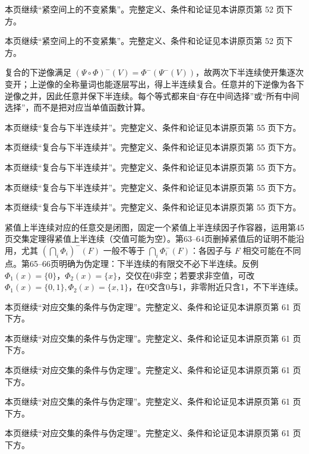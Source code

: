 本页继续“紧空间上的不变紧集”。完整定义、条件和论证见本讲原页第 52 页下方。

本页继续“紧空间上的不变紧集”。完整定义、条件和论证见本讲原页第 52 页下方。

复合的下逆像满足 $(\Psi\circ\Phi)^-(V)=\Phi^-(\Psi^-(V))$，故两次下半连续使开集逐次变开；上逆像的全称量词也能逐层写出，得上半连续复合。任意并的下逆像为各下逆像之并，因此任意并保下半连续。每个等式都来自“存在中间选择”或“所有中间选择”，而不是把对应当单值函数计算。

本页继续“复合与下半连续并”。完整定义、条件和论证见本讲原页第 55 页下方。

本页继续“复合与下半连续并”。完整定义、条件和论证见本讲原页第 55 页下方。

本页继续“复合与下半连续并”。完整定义、条件和论证见本讲原页第 55 页下方。

本页继续“复合与下半连续并”。完整定义、条件和论证见本讲原页第 55 页下方。

本页继续“复合与下半连续并”。完整定义、条件和论证见本讲原页第 55 页下方。

紧值上半连续对应的任意交是闭图，固定一个紧值上半连续因子作容器，运用第45页交集定理得紧值上半连续（交值可能为空）。第63--64页删掉紧值后的证明不能沿用，尤其 $(\bigcap_i\Phi_i)^-(F)$ 一般不等于 $\bigcap_i\Phi_i^-(F)$：各因子与 $F$ 相交可能在不同点。第65--66页明确为伪定理：下半连续的有限交不必下半连续。反例 $\Phi_1(x)=\{0\}$，$\Phi_2(x)=\{x\}$，交仅在0非空；若要求非空值，可改 $\Phi_1(x)=\{0,1\},\Phi_2(x)=\{x,1\}$，在0交含0与1，非零附近只含1，不下半连续。

本页继续“对应交集的条件与伪定理”。完整定义、条件和论证见本讲原页第 61 页下方。

本页继续“对应交集的条件与伪定理”。完整定义、条件和论证见本讲原页第 61 页下方。

本页继续“对应交集的条件与伪定理”。完整定义、条件和论证见本讲原页第 61 页下方。

本页继续“对应交集的条件与伪定理”。完整定义、条件和论证见本讲原页第 61 页下方。

本页继续“对应交集的条件与伪定理”。完整定义、条件和论证见本讲原页第 61 页下方。

